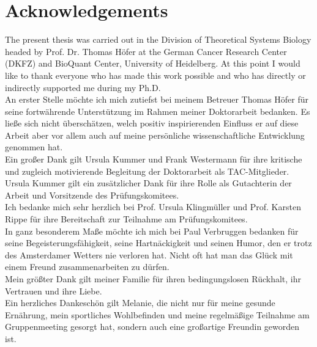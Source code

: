 \chapter*{Acknowledgements}
\thispagestyle{plain2}

The present thesis was carried out in the Division of Theoretical Systems Biology headed by 
Prof. Dr. Thomas H\"ofer at the German Cancer Research Center (DKFZ) and BioQuant Center, 
University of Heidelberg. At this point I would like to thank everyone who has made this work 
possible and who has directly or indirectly supported me during my Ph.D. \\

An erster Stelle m\"ochte ich mich zutiefst bei meinem Betreuer Thomas H\"ofer f\"ur seine fortw\"ahrende Unterst\"utzung im Rahmen meiner Doktorarbeit  bedanken. Es lie\ss{}e sich nicht \"ubersch\"atzen, welch positiv inspirierenden Einfluss er auf diese Arbeit aber vor allem auch auf meine pers\"onliche wissenschaftliche Entwicklung genommen hat. \\

Ein gro\ss{}er Dank gilt Ursula Kummer und Frank Westermann f\"ur ihre kritische und zugleich motivierende Begleitung der Doktorarbeit als TAC-Mitglieder. Ursula Kummer gilt ein zus\"atzlicher Dank f\"ur ihre Rolle als Gutachterin der Arbeit und Vorsitzende des Pr\"ufungskomitees.\\

Ich bedanke mich sehr herzlich bei Prof. Ursula Klingm\"uller und Prof. Karsten Rippe f\"ur ihre Bereitschaft zur Teilnahme am Pr\"ufungskomitees.\\

In ganz besonderem Ma\ss{}e m\"{o}chte ich mich bei Paul Verbruggen bedanken f\"ur seine Begeisterungsf\"{a}higkeit, seine Hartn\"{a}ckigkeit und seinen Humor, den er trotz des Amsterdamer Wetters nie verloren hat. Nicht oft hat man das Gl\"{u}ck mit einem Freund zusammenarbeiten zu d\"{u}rfen.\\

Mein gr\"o\ss{}ter Dank gilt meiner Familie f\"{u}r ihren bedingungslosen R\"{u}ckhalt, ihr Vertrauen und ihre Liebe.\\

Ein herzliches Dankesch\"{o}n gilt Melanie, die nicht nur f\"{u}r meine gesunde Ern\"{a}hrung, mein sportliches Wohlbefinden und meine regelm\"{a}\ss{}ige Teilnahme am Gruppenmeeting gesorgt hat, sondern auch eine gro\ss{}artige Freundin geworden ist. \\      


